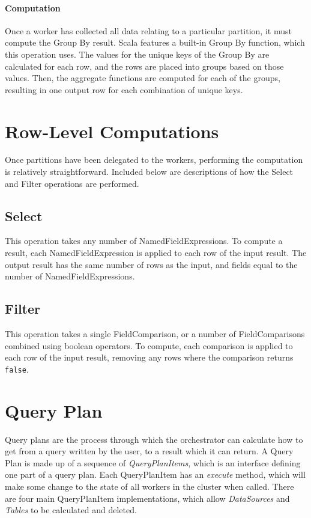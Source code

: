 \paragraph{Computation}
Once a worker has collected all data relating to a particular partition, it must compute the Group By result. Scala features a built-in Group By function, which this operation uses. The values for the unique keys of the Group By are calculated for each row, and the rows are placed into groups based on those values. Then, the aggregate functions are computed for each of the groups, resulting in one output row for each combination of unique keys. 



\section{Row-Level Computations}
Once partitions have been delegated to the workers, performing the computation is relatively straightforward. Included below are descriptions of how the Select and Filter operations are performed.

\subsection{Select} 
This operation takes any number of NamedFieldExpressions. To compute a result, each NamedFieldExpression is applied to each row of the input result. The output result has the same number of rows as the input, and fields equal to the number of NamedFieldExpressions. 

\subsection{Filter}
This operation takes a single FieldComparison, or a number of FieldComparisons combined using boolean operators. To compute, each comparison is applied to each row of the input result, removing any rows where the comparison returns \texttt{false}.



\section{Query Plan}
Query plans are the process through which the orchestrator can calculate how to get from a query written by the user, to a result which it can return. A Query Plan is made up of a sequence of \textit{QueryPlanItems}, which is an interface defining one part of a query plan. Each QueryPlanItem has an \textit{execute} method, which will make some change to the state of all workers in the cluster when called. There are four main QueryPlanItem implementations, which allow \textit{DataSources} and \textit{Tables} to be calculated and deleted.

